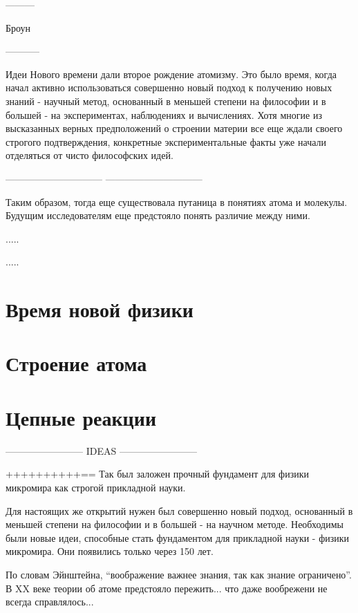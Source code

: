 ---------

Броун


-----------

Идеи Нового времени дали второе рождение атомизму.
Это было время, когда начал активно использоваться совершенно новый подход к получению новых знаний - научный метод, основанный в меньшей степени на философии и в большей - на экспериментах, наблюдениях и вычислениях.
Хотя многие из высказанных верных предположений о строении материи все еще ждали своего строгого подтверждения, конкретные экспериментальные факты уже начали отделяться от чисто философских идей.


------------------------------
------------------------------


Таким образом, тогда еще существовала путаница в понятиях атома и молекулы.
Будущим исследователям еще предстояло понять различие между ними.


.....





.....






\section*{Время новой физики}


\section*{Строение атома}


\section*{Цепные реакции}


------------------------ IDEAS ------------------------ 

++++++++++==
Так был заложен прочный фундамент для физики микромира как строгой прикладной науки. 


Для настоящих же открытий нужен был совершенно новый подход, основанный в меньшей степени на философии и в большей - на научном методе. 
Необходимы были новые идеи, способные стать фундаментом для прикладной науки - физики микромира. 
Они появились только через 150 лет.

По словам Эйнштейна, ``воображение важнее знания, так как знание ограничено''.
В XX веке теории об атоме предстояло пережить... что даже вообрежени не всегда справлялось...






